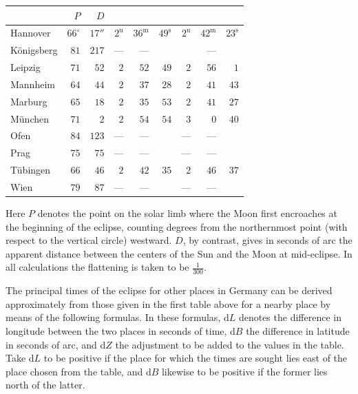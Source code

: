 \begin{center}\small\setlength{\tabcolsep}{3pt}
\begin{tabular}{l|r|r|rrr|rrr}
  &  $P$  &  $D$  &    &    \\
\hline
 Hannover  &  $66^\circ$  &  $17''$  &  $2^{\mathrm u}$  &  $36^{\mathrm m}$  &  $49^{\mathrm s}$  &  $2^{\mathrm u}$  &  $42^{\mathrm m}$  &  $23^{\mathrm s}$ \\
 Königsberg  &  $81$  &  $217$  &  ---  &  ---  &   &  & --- &  \\
 Leipzig  &  $71$  &  $52$  &  $2$  &  $52$  &  $49$  &  $2$  &  $56$  &  $1$ \\
 Mannheim  &  $64$  &  $44$  &  $2$  &  $37$  &  $28$  &  $2$  &  $41$  &  $43$ \\
 Marburg  &  $65$  &  $18$  &  $2$  &  $35$  &  $53$  &  $2$  &  $41$  &  $27$ \\
 München  &  $71$  &  $2$  &  $2$  &  $54$  &  $54$  &  $3$  &  $0$  &  $40$ \\
 Ofen  &  $84$  &  $123$  &  ---  &  ---  &   &  ---  &  ---  &  \\
 Prag  &  $75$  &  $75$  &  ---  &  ---  &   &  ---  &  ---  &  \\
 Tübingen  &  $66$  &  $46$  &  $2$  &  $42$  &  $35$  &  $2$  &  $46$  &  $37$ \\
 Wien  &  $79$  &  $87$  &  ---  &  ---  &   &  ---  &  ---  &  \\
\end{tabular}
\end{center}

Here $P$ denotes the point on the solar limb where the Moon first encroaches at the beginning of the eclipse, counting degrees from the northernmost point (with respect to the vertical circle)  westward. $D$, by contrast, gives in seconds of arc the apparent distance between the centers of the Sun and the Moon at mid-eclipse. In all calculations the flattening is taken to be $\tfrac{1}{300}$.

The principal times of the eclipse for other places in Germany can be derived approximately from those given in the first table above for a nearby place by means of the following formulas. In these formulas, d$L$ denotes the difference in longitude between the two places in seconds of time, d$B$ the difference in latitude in seconds of arc, and d$Z$ the adjustment to be added to the values in the table. Take d$L$ to be positive if the place for which the times are sought lies east of the place chosen from the table, and d$B$ likewise to be positive if the former lies north of the latter.

